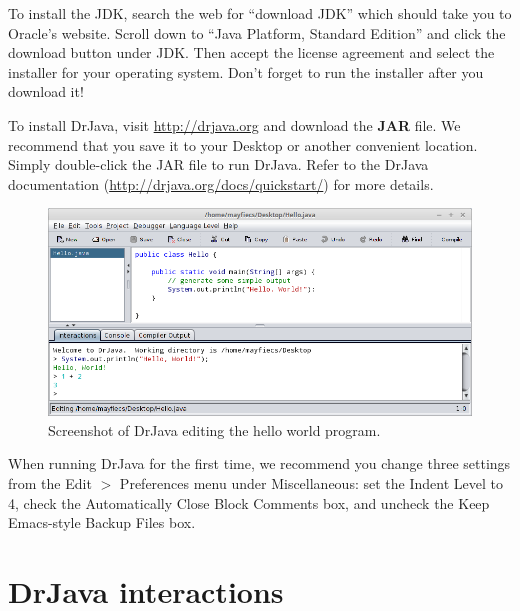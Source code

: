 To install the JDK, search the web for ``download JDK'' which should take you to Oracle's website.
Scroll down to ``Java Platform, Standard Edition'' and click the download button under JDK.
Then accept the license agreement and select the installer for your operating system.
Don't forget to run the installer after you download it!


To install DrJava, visit \url{http://drjava.org} and download the {\bf JAR} file.
We recommend that you save it to your Desktop or another convenient location.
Simply double-click the JAR file to run DrJava.
Refer to the DrJava documentation (\url{http://drjava.org/docs/quickstart/}) for more details.

\begin{figure}[!ht]
\begin{center}
\includegraphics[width=\textwidth]{figs/drjava-hello.png}
\caption{Screenshot of DrJava editing the hello world program.}
\label{fig.drjava1}
\end{center}
\end{figure}

When running DrJava for the first time, we recommend you change three settings from the {\sf Edit $>$ Preferences} menu under {\sf Miscellaneous}: set the {\sf Indent Level} to 4, check the {\sf Automatically Close Block Comments} box, and uncheck the {\sf Keep Emacs-style Backup Files} box.




\section{DrJava interactions}
\label{interactions}


